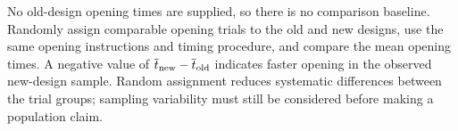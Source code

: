 No old-design opening times are supplied, so there is no comparison baseline. Randomly assign comparable opening trials to the old and new designs, use the same opening instructions and timing procedure, and compare the mean opening times. A negative value of $\overline t_{\rm new}-\overline t_{\rm old}$ indicates faster opening in the observed new-design sample. Random assignment reduces systematic differences between the trial groups; sampling variability must still be considered before making a population claim.
